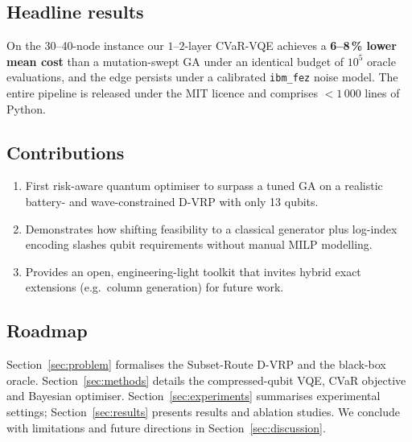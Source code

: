 \subsection{Headline results}

On the 30--40-node instance our $1$--$2$-layer CVaR-VQE achieves a \textbf{6--8\,\% lower mean cost} than a mutation-swept GA under an identical budget of $10^{5}$ oracle evaluations, and the edge persists under a calibrated \texttt{ibm\_fez} noise model.  
The entire pipeline is released under the MIT licence and comprises $<\!1\,000$ lines of Python.

\subsection{Contributions}

\begin{enumerate}[leftmargin=*,nosep]
\item First risk-aware quantum optimiser to surpass a tuned GA on a realistic battery- and wave-constrained D-VRP with only 13 qubits.
\item Demonstrates how shifting feasibility to a classical generator plus log-index encoding slashes qubit requirements without manual MILP modelling.
\item Provides an open, engineering-light toolkit that invites hybrid exact extensions (e.g.\ column generation) for future work.
\end{enumerate}

\subsection{Roadmap}

Section~\ref{sec:problem} formalises the Subset-Route D-VRP and the black-box oracle.  
Section~\ref{sec:methods} details the compressed-qubit VQE, CVaR objective and Bayesian optimiser.  
Section~\ref{sec:experiments} summarises experimental settings; Section~\ref{sec:results} presents results and ablation studies.  
We conclude with limitations and future directions in Section~\ref{sec:discussion}.
